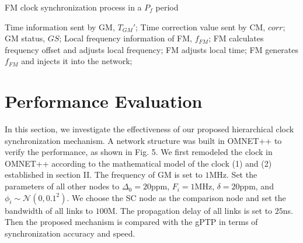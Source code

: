 \documentclass[conference]{IEEEtran}
\begin{document}
	
	\begin{algorithm}[ht]  
		\caption{FM clock synchronization process in a $P_f$ period}  
		\begin{algorithmic}[1]
			\REQUIRE Time information sent by GM, $T_{GM}'$; Time correction value sent by CM, $corr$; GM status, $GS$;
			\ENSURE Local frequency information of FM, $f_{FM}$;
			\REPEAT
			\STATE FM calculates frequency offset and adjusts local frequency;
			\ENDIF
			\STATE FM adjusts local time;
			\ENDIF
			\ENDIF
			\STATE FM generates $f_{FM}$ and injects it into the network;
			\ENDWHILE
		\end{algorithmic}
	\end{algorithm}
	
	
	
	
	
	
	
	
	
	
	
	
	\section{Performance Evaluation}
	
	In this section, we investigate the effectiveness of our proposed hierarchical clock synchronization mechanism. A network structure was built in OMNET++ to verify the performance, as shown in Fig. 5. We first remodeled the clock in OMNET++ according to the mathematical model of the clock (1) and (2) established in section II. The frequency of GM is set to $1$MHz. Set the parameters of all other nodes to $\Delta_0=20$ppm, $F_i=1$MHz, $\delta=20$ppm, and $\phi_i \sim \mathcal N(0,{0.1}^2)$. We choose the SC node as the comparison node and set the bandwidth of all links to $100$M. The propagation delay of all links is set to $25$ns. Then the proposed mechanism is compared with the gPTP in terms of synchronization accuracy and speed.
	
\end{document}

